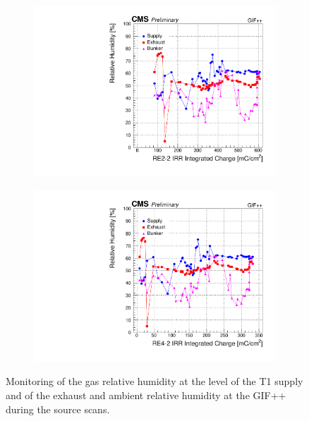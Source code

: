 	\begin{figure}[H]
    	\begin{subfigure}{0.5\linewidth}
    		\centering
			\includegraphics[width = \linewidth]{fig/chapt5/RE2-2-Humidity-monitoring.pdf}
        	\caption{\label{fig:GIFpp-Humidity:A}}
    	\end{subfigure}
    	\begin{subfigure}{0.5\linewidth}
			\centering
    		\includegraphics[width = \linewidth]{fig/chapt5/RE4-2-Humidity-monitoring.pdf}
        	\caption{\label{fig:GIFpp-Humidity:B}}
    	\end{subfigure}
		\caption{\label{fig:GIFpp-Humidity} Monitoring of the gas relative humidity at the level of the T1 supply and of the exhaust and ambient relative humidity at the GIF++ during the source scans.}
	\end{figure}

